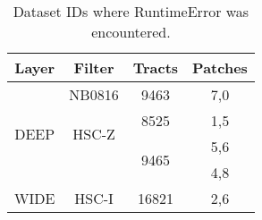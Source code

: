 \begin{table}[h]
\centering
\begin{tabular} {|c|c|c|c|}
\hline
Layer & Filter & Tracts  & Patches  \\
\hline

\multirow{4}{*}{DEEP}  & NB0816                 & 9463                   & 7,0 \\ \cline{2-4}
                       & \multirow{2}{*}{HSC-Z} & 8525                   & 1,5 \\ \cline{3-4}
                       &                        & \multirow{2}{*}{9465}  & 5,6 \\
                       &                        &                        & 4,8 \\ \hline
WIDE                   & HSC-I                  & 16821                  & 2,6 \\
\hline
\end{tabular}
\caption{Dataset IDs where RuntimeError was encountered.}
\label{RuntimeErrorsTable}
\end{table}
